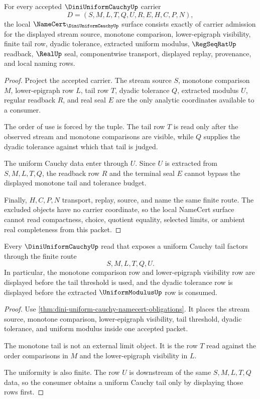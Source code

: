\begin{theorem}
\label{thm:dini-uniform-cauchy-namecert-obligations}
For every accepted $\DiniUniformCauchyUp$ carrier
$$
D=(S,M,L,T,Q,U,R,E,H,C,P,N),
$$
the local $\NameCert_{\DiniUniformCauchyUp}$ surface consists exactly of carrier admission for the displayed stream source, monotone comparison, lower-epigraph visibility, finite tail row, dyadic tolerance, extracted uniform modulus, $\RegSeqRatUp$ readback, $\RealUp$ seal, componentwise transport, displayed replay, provenance, and local naming rows.
\end{theorem}
\begin{proof}
Project the accepted carrier. The stream source $S$, monotone comparison $M$, lower-epigraph row $L$, tail row $T$, dyadic tolerance $Q$, extracted modulus $U$, regular readback $R$, and real seal $E$ are the only analytic coordinates available to a consumer.

The order of use is forced by the tuple. The tail row $T$ is read only after the observed stream and monotone comparisons are visible, while $Q$ supplies the dyadic tolerance against which that tail is judged.

The uniform Cauchy data enter through $U$. Since $U$ is extracted from $S,M,L,T,Q$, the readback row $R$ and the terminal seal $E$ cannot bypass the displayed monotone tail and tolerance budget.

Finally, $H,C,P,N$ transport, replay, source, and name the same finite route. The excluded objects have no carrier coordinate, so the local NameCert surface cannot read compactness, choice, quotient equality, selected limits, or ambient real completeness from this packet.
\end{proof}

\begin{theorem}
\label{thm:dini-uniform-cauchy-monotone-tail-extraction}
Every $\DiniUniformCauchyUp$ read that exposes a uniform Cauchy tail factors through the finite route
$$
S,M,L,T,Q,U .
$$
In particular, the monotone comparison row and lower-epigraph visibility row are displayed before the tail threshold is used, and the dyadic tolerance row is displayed before the extracted $\UniformModulusUp$ row is consumed.
\end{theorem}
\begin{proof}
Use \autoref{thm:dini-uniform-cauchy-namecert-obligations}. It places the stream source, monotone comparison, lower-epigraph visibility, tail threshold, dyadic tolerance, and uniform modulus inside one accepted packet.

The monotone tail is not an external limit object. It is the row $T$ read against the order comparisons in $M$ and the lower-epigraph visibility in $L$.

The uniformity is also finite. The row $U$ is downstream of the same $S,M,L,T,Q$ data, so the consumer obtains a uniform Cauchy tail only by displaying those rows first.
\end{proof}

